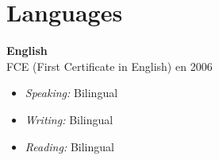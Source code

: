 \section{Languages}

\begin{large}
\textbf{English}\\


FCE (First Certificate in English) en 2006
\end{large}
\begin{itemize}
\item \textit{Speaking:} Bilingual
\item \textit{Writing:} Bilingual
\item \textit{Reading:} Bilingual
\end{itemize}
